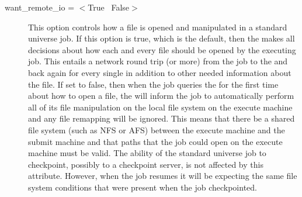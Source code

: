 \begin{description}

\label{condor-submit-want-remote-io}
\item[want\_remote\_io = $<$True \Bar\ False$>$]
This option controls how a file is opened and manipulated in a standard
universe job.
If this option is true, which is the default, then the 
makes all decisions about how each and every file should be opened by
the executing job.
This entails a network round trip (or more) from the job to the
 and back again for every single 
in addition to other needed information about the file.
If set to false, then when the job queries the  for the
first time about how to open a file, the  will inform the
job to automatically perform all of its file manipulation on the local
file system on the execute machine and any file remapping will be ignored.
This means that there  be a shared file system (such
as NFS or AFS) between the execute machine and the submit machine and that
 paths that the job could open on the execute machine must be valid.
The ability of the standard universe job to checkpoint, possibly to a
checkpoint server, is not affected by this attribute.
However, when the job resumes it will be expecting the same file system
conditions that were present when the job checkpointed.

\end{description} 


